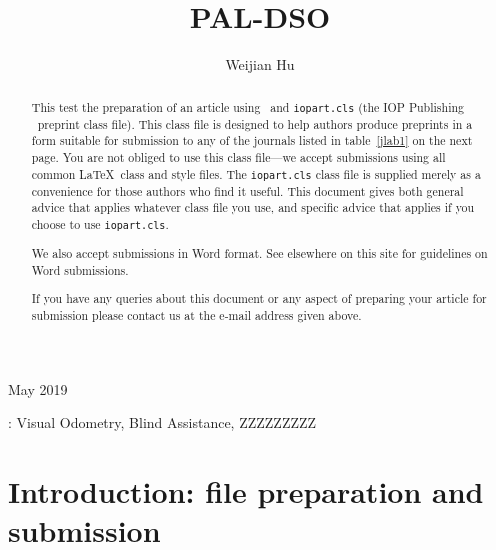 \documentclass[12pt]{iopart}
\begin{document}
\title[Author guidelines for IOP Publishing journals in  \LaTeXe]
{PAL-DSO}

\author{Weijian Hu}

\address{Zhejiang University, Temple Way, Hangzhou, China}
\vspace{10pt}
\begin{indented}
\item[]May 2019
\end{indented}

\begin{abstract}
This test the preparation of an article using \LaTeXe\ and 
\verb"iopart.cls" (the IOP Publishing \LaTeXe\ preprint class file).
This class file is designed to help 
authors produce preprints in a form suitable for submission to any of the
journals listed in table~\ref{jlab1} on the next page.  You are not obliged to use this class file---we accept
submissions using all common \LaTeX\ class and style files.  The \verb"iopart.cls"
class file is supplied merely as a convenience for those authors who find it useful.
This document gives both general advice that applies whatever class file you use, and specific advice
that applies if you choose to use \verb"iopart.cls".

We also accept submissions in Word format.  See elsewhere on this site for guidelines on Word submissions.

If you have any queries about this document or any aspect of preparing your article for submission please contact us at the e-mail address given above.
\end{abstract}


\vspace{2pc}
: Visual Odometry, Blind Assistance, ZZZZZZZZZ

\submitto{\MST}

% 




\section{Introduction: file preparation and submission}
\end{document}
